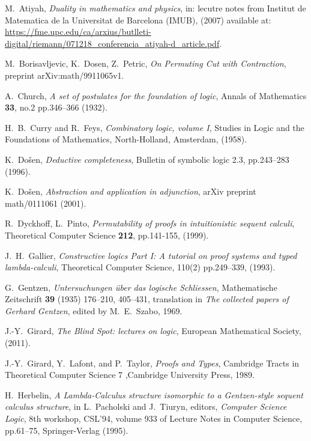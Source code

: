 \documentclass[english,letter paper,12pt,leqno]{article}
\theoremstyle{example}
\numberwithin{equation}{section}
\begin{document}

\providecommand{\bysame}{\leavevmode\hbox to3em{\hrulefill}\thinspace}
\providecommand{\href}[2]{#2}
\begin{thebibliography}{BHLS03}

M.~Atiyah, \textsl{Duality in mathematics and physics}, in: lecutre notes from Institut de Matematica de la Universitat de Barcelona (IMUB), (2007) available at: \url{https://fme.upc.edu/ca/arxius/butlleti-digital/riemann/071218_conferencia_atiyah-d_article.pdf}.

M.~Borisavljevic, K.~Dosen, Z.~Petric, \textsl{On Permuting Cut with Contraction}, preprint arXiv:math/9911065v1.

A.~Church, \textsl{A set of postulates for the foundation of logic}, Annals of Mathematics \textbf{33}, no.2 pp.346--366 (1932).

H.~B.~Curry and R.~Feys, \textsl{Combinatory logic, volume I}, Studies in Logic and the Foundations of Mathematics, North-Holland, Amsterdam, (1958).

K.~Do\v{s}en, \textsl{Deductive completeness}, Bulletin of symbolic logic 2.3, pp.243--283 (1996).

K.~Do\v{s}en, \textsl{Abstraction and application in adjunction}, arXiv preprint math/0111061 (2001).

R.~Dyckhoff, L.~Pinto, \textsl{Permutability of proofs in intuitionistic sequent calculi}, Theoretical Computer Science \textbf{212}, pp.141-155, (1999).

J.~H.~Gallier, \textsl{Constructive logics Part I: A tutorial on proof systems and typed lambda-calculi}, Theoretical Computer Science, 110(2) pp.249--339, (1993).

G.~Gentzen, \textsl{Untersuchungen \"uber das logische Schliessen}, Mathematische Zeitschrift \textbf{39} (1935) 176--210, 405--431, translation in \textsl{The collected papers of Gerhard Gentzen}, edited by M.~E.~Szabo, 1969.

J.-Y.~Girard, \textsl{The Blind Spot: lectures on logic}, European Mathematical Society, (2011).

J.-Y.~Girard, Y.~Lafont, and P.~Taylor, \textsl{Proofs and Types}, Cambridge Tracts in Theoretical Computer Science 7 ,Cambridge University Press, 1989.

H.~Herbelin, \textsl{A Lambda-Calculus structure isomorphic to a Gentzen-style sequent calculus structure}, in L.~Pacholski and J.~Tiuryn, editors, \textsl{Computer Science Logic}, 8th workshop, CSL'94, volume 933 of Lecture Notes in Computer Science, pp.61--75, Springer-Verlag (1995).


\end{thebibliography}
\end{document}
